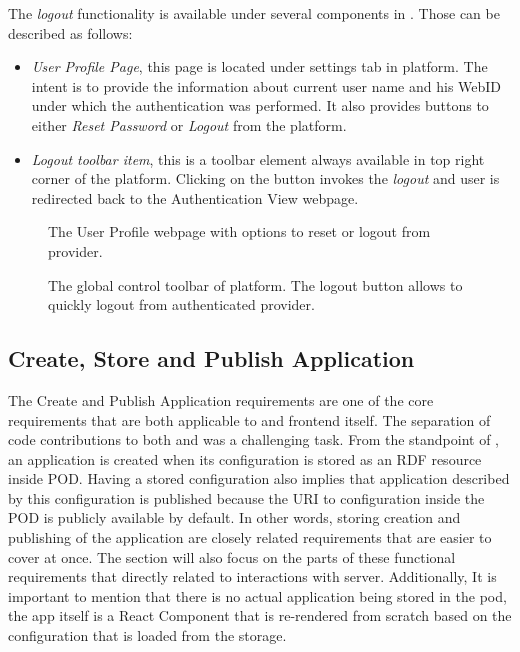 The \textit{logout} functionality is available under several components in \lpa{}. Those can be described as follows:
\begin{itemize}
	\item \textit{User Profile Page}, this page is located under settings tab in \lpa{} platform. The intent is to provide the information about current user name and his WebID under which the authentication was performed. It also provides buttons to either \textit{Reset Password} or \textit{Logout} from the platform.
	\item \textit{Logout toolbar item}, this is a toolbar element always available in top right corner of the platform. Clicking on the button invokes the \textit{logout} and user is redirected back to the Authentication View webpage.
\end{itemize}

\begin{figure}[hbt]
  \caption{The User Profile webpage with options to reset or logout from \solid{} provider.}
  \label{fig:solid_login_webpage}
\endminipage\hfill
{}
  \caption{The global control toolbar of \lpa{} platform. The logout button allows to quickly logout from authenticated \solid{} provider.}
  \label{fig:solid_register_webpage}
\endminipage\hfill
\end{figure}

\subsection{Create, Store and Publish Application}

The Create and Publish Application requirements are one of the core requirements that are both applicable to \lpas{} and \lpa{} frontend itself. The separation of code contributions to both \lpa{} and \lpas{} was a challenging task. From the standpoint of \lpas{}, an application is created when its configuration is stored as an RDF resource inside \solid{} POD. Having a stored configuration also implies that application described by this configuration is published because the URI to configuration inside the POD is publicly available by default. In other words, storing creation and publishing of the application are closely related requirements that are easier to cover at once. The section will also focus on the parts of these functional requirements that directly related to interactions with \solid{} server. Additionally, It is important to mention that there is no actual application being stored in the \solid{} pod, the app itself is a React Component that is re-rendered from scratch based on the \lpa{} configuration that is loaded from the storage. 

